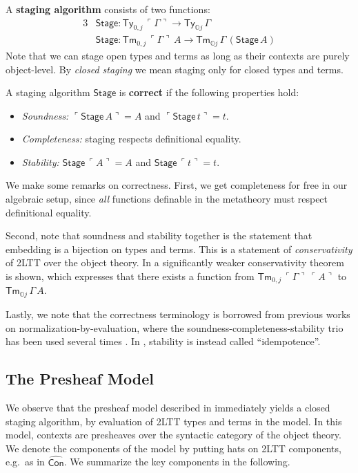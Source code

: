 \documentclass[acmsmall]{acmart}
\newcommand{\msf}[1]{\mathsf{#1}}
\newcommand{\mbb}[1]{\mathbb{#1}}
\newcommand{\wh}[1]{\widehat{#1}}
\newcommand{\mbbo}{\mbb{O}}
\newcommand{\Ty}{\msf{Ty}}
\newcommand{\Tm}{\msf{Tm}}
\newcommand{\hCon}{\wh{\msf{Con}}}
\newcommand{\emb}[1]{\ulcorner#1\urcorner}
\newcommand{\Stage}{\msf{Stage}}
\theoremstyle{remark}
\begin{document}
\begin{definition}
A \textbf{staging algorithm} consists of two functions:
  \begin{alignat*}{3}
    & \Stage : \Ty_{0,j}\,\emb{\Gamma} \to \Ty_{\mbbo j}\,\Gamma \\
    & \Stage : \Tm_{0,j}\,\emb{\Gamma}\,A \to \Tm_{\mbbo j}\,\Gamma\,(\Stage\,A)
  \end{alignat*}
Note that we can stage open types and terms as long as their contexts are purely
object-level. By \emph{closed staging} we mean staging only for closed types and
terms.
\end{definition}
\begin{definition}
  A staging algorithm $\Stage$ is \textbf{correct} if the following properties hold:
  \begin{itemize}
  \item \emph{Soundness:} $\emb{\Stage\,A} = A$ and $\emb{\Stage\,t} = t$.
  \item \emph{Completeness:} staging respects definitional equality.
  \item \emph{Stability:} $\Stage\,\emb{A} = A$ and $\Stage\,\emb{t} = t$.
  \end{itemize}
\end{definition}
We make some remarks on correctness. First, we get completeness for free in our
algebraic setup, since \emph{all} functions definable in the metatheory must
respect definitional equality.

Second, note that soundness and stability together is the statement that
embedding is a bijection on types and terms. This is a statement of
\emph{conservativity} of 2LTT over the object theory. In \cite{TODO} a
significantly weaker conservativity theorem is shown, which expresses that there
exists a function from $\Tm_{0,j}\,\emb{\Gamma}\,\emb{A}$ to $\Tm_{\mbbo
  j}\,\Gamma\,A$.

Lastly, we note that the correctness terminology is borrowed from previous works
on normalization-by-evaluation, where the soundness-completeness-stability trio
has been used several times \cite{TODO}. In \cite{cubicalnbe}, stability is
instead called ``idempotence''.

\subsection{The Presheaf Model}

We observe that the presheaf model described in \cite[Section~2.5.3]{twolevel}
immediately yields a closed staging algorithm, by evaluation of 2LTT types and
terms in the model. In this model, contexts are presheaves over the syntactic
category of the object theory. We denote the components of the model by putting
hats on 2LTT components, e.g.\ as in $\hCon$. We summarize the key components in
the following.
\end{document}
